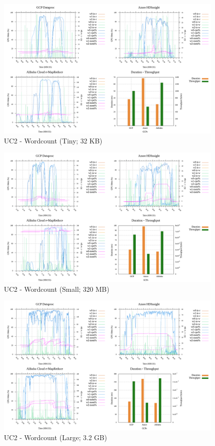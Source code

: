 \documentclass[review]{elsarticle}
\begin{document}
\begin{figure}[p]
	\caption{UC2 - Wordcount (Tiny; 32 KB)}
	\label{fig:uc2-wrdcnt-t-cmidt}
	\includegraphics[width=\textwidth]{uc2-wrdcnt-t-cmidt}
	\centering
\end{figure}

\begin{figure}[p]
	\caption{UC2 - Wordcount (Small; 320 MB)}
	\label{fig:uc2-wrdcnt-s-cmidt}
	\includegraphics[width=\textwidth]{uc2-wrdcnt-s-cmidt}
	\centering
\end{figure}

\begin{figure}[p]
	\caption{UC2 - Wordcount (Large; 3.2 GB)}
	\label{fig:uc2-wrdcnt-l-cmidt}
	\includegraphics[width=\textwidth]{uc2-wrdcnt-l-cmidt}
	\centering
\end{figure}
\end{document}
